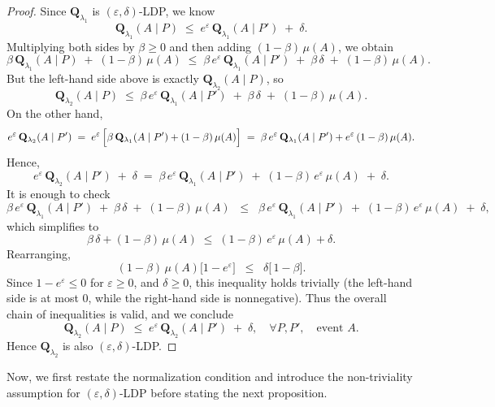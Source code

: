 \documentclass[accepted]{article}
\theoremstyle{plain} %
\theoremstyle{definition}
\theoremstyle{remark}
\newcommand{\eps}{\varepsilon}
\newcommand{\bQ}{\mathbf{Q}}
\begin{document}
\begin{proof}
Since $\bQ_{\lambda_1}$ is $(\varepsilon,\delta)$-LDP, we know
\[
  \bQ_{\lambda_1}(A \mid P)
  \;\le\;
  e^\varepsilon\, \bQ_{\lambda_1}(A \mid P') \;+\;\delta.
\]
Multiplying both sides by $\beta \ge 0$ and then adding $(1-\beta)\,\mu(A)$, we obtain
\[
  \beta\,\bQ_{\lambda_1}(A \mid P) \;+\; (1-\beta)\,\mu(A)
  \;\le\;
  \beta\,e^\varepsilon\,\bQ_{\lambda_1}(A \mid P')
  \;+\;
  \beta\,\delta
  \;+\;
  (1-\beta)\,\mu(A).
\]
But the left-hand side above is exactly $\bQ_{\lambda_2}(A \mid P)$, so
\[
  \bQ_{\lambda_2}(A \mid P)
  \;\le\;
  \beta\,e^\varepsilon\,\bQ_{\lambda_1}(A \mid P')
  \;+\;
  \beta\,\delta
  \;+\;
  (1-\beta)\,\mu(A).
\]
On the other hand,
\[
  e^\varepsilon\,\bQ_{\lambda_2}(A \mid P')
  \;=\;
  e^\varepsilon\,\Bigl[\beta\,\bQ_{\lambda_1}(A \mid P') + (1-\beta)\,\mu(A)\Bigr]
  \;=\;
  \beta\,e^\varepsilon\,\bQ_{\lambda_1}(A \mid P') + e^\varepsilon\,(1-\beta)\,\mu(A).
\]
Hence,
\[
  e^\varepsilon\,\bQ_{\lambda_2}(A \mid P') \;+\;\delta
  \;=\;
  \beta\,e^\varepsilon\,\bQ_{\lambda_1}(A \mid P')
  \;+\;
  (1-\beta)\,e^\varepsilon\,\mu(A)
  \;+\;\delta.
\]
It is enough to check
\[
  \beta\,e^\varepsilon\,\bQ_{\lambda_1}(A \mid P')
  \;+\;
  \beta\,\delta
  \;+\;
  (1-\beta)\,\mu(A)
  \;\;\le\;\;
  \beta\,e^\varepsilon\,\bQ_{\lambda_1}(A \mid P')
  \;+\;
  (1-\beta)\,e^\varepsilon\,\mu(A)
  \;+\;
  \delta,
\]
which simplifies to
\[
  \beta\,\delta + (1-\beta)\,\mu(A)
  \;\le\;
  (1-\beta)\,e^\varepsilon\,\mu(A) + \delta.
\]
Rearranging,
\[
  (1-\beta)\,\mu(A)\bigl[1 - e^\varepsilon\bigr]
  \;\;\le\;\;
  \delta \bigl[\,1 - \beta\bigr].
\]
Since $1 - e^\varepsilon \le 0$ for $\varepsilon \ge 0$, and $\delta \ge 0$, this inequality holds trivially (the left-hand side is at most $0$, while the right-hand side is nonnegative). Thus the overall chain of inequalities is valid, and we conclude
\[
  \bQ_{\lambda_2}(A \mid P)
  \;\le\;
  e^\varepsilon\,\bQ_{\lambda_2}(A \mid P') \;+\;\delta,
  \quad
  \forall P,P',\quad \text{event } A.
\]
Hence $\bQ_{\lambda_2}$ is also $(\varepsilon,\delta)$-LDP.
\end{proof}

Now, we first restate the normalization condition and introduce the non-triviality assumption for $(\eps,\delta)$-LDP before stating the next proposition.
\end{document}

